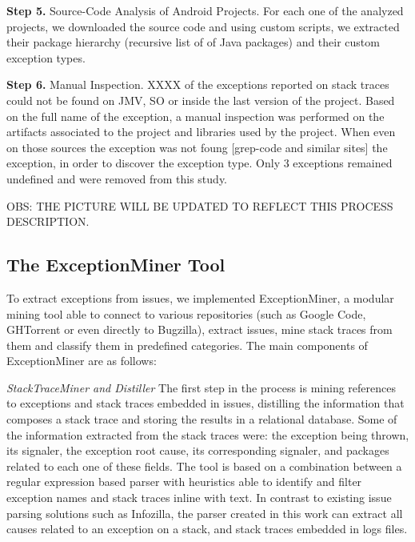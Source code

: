 \documentclass[conference]{IEEEtran}
\begin{document}
\textbf{Step 5.}  Source-Code Analysis of Android Projects. 
For each one of the analyzed projects, we
downloaded the source code and using custom scripts, we extracted their package
hierarchy (recursive list of of Java packages) and their custom exception types.

\textbf{Step 6.}  Manual Inspection. XXXX of the exceptions reported on stack traces  could not be found on JMV, SO or inside the last version of the project. Based on the full name of the exception, a manual inspection was performed on the artifacts associated to the project and libraries used by the project. When even on those sources the exception was not foung [grep-code and similar sites] the exception, in order to discover the exception type. Only 3 exceptions remained undefined and were removed from this study.

OBS: THE PICTURE WILL BE UPDATED TO REFLECT THIS PROCESS DESCRIPTION.

\subsection{The ExceptionMiner Tool}
\label{sec:exceptionminer}

To extract exceptions from issues, we implemented ExceptionMiner, a modular
mining tool able to connect to various repositories (such as Google Code,
GHTorrent or even directly to Bugzilla), extract issues, mine stack traces from
them and classify them in predefined categories. The main components of
ExceptionMiner are as follows:

\noindent\emph{StackTraceMiner and Distiller} The first step in the process is
mining references to exceptions and stack traces embedded in issues, distilling
the information that composes a stack trace and storing the results in a
relational database. Some of the information extracted from the stack traces were:
 the exception being thrown, its signaler, the exception root cause, its corresponding signaler,
and packages related to each one of these fields.
The tool is based on a combination between a regular expression based parser 
with heuristics able to identify and filter exception names and stack traces inline with text. In
contrast to existing issue parsing solutions such as Infozilla, the parser
created in this work can extract all causes related to an exception on a stack,
and stack traces embedded in logs files.

\end{document}
